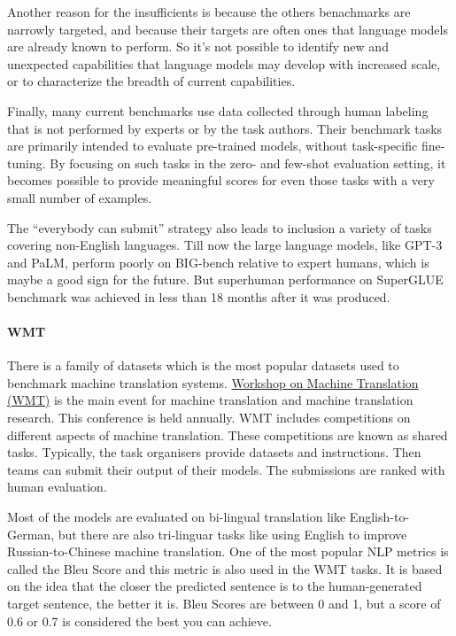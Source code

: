 \documentclass[
]{krantz}
\begin{document}
Another reason for the insufficients is because the others benachmarks are narrowly targeted, and because their targets are often ones that language models are already known to perform. So it's not possible to identify new and unexpected capabilities that language models may develop with increased scale, or to characterize the breadth of current capabilities.

Finally, many current benchmarks use data collected through human labeling that is not performed by experts or by the task authors. Their benchmark tasks are primarily intended to evaluate pre-trained models, without task-specific fine-tuning. By focusing on such tasks in the zero- and few-shot evaluation setting, it becomes possible to provide meaningful scores for even those tasks with a very small number of examples.

The ``everybody can submit'' strategy also leads to inclusion a variety of tasks covering non-English languages. Till now the large language models, like GPT-3 and PaLM, perform poorly on BIG-bench relative to expert humans, which is maybe a good sign for the future. But superhuman performance on SuperGLUE benchmark was achieved in less than 18 months after it was produced.

\hypertarget{wmt}{%
\paragraph{WMT}\label{wmt}}

There is a family of datasets which is the most popular datasets used to benchmark machine translation systems. \href{https://machinetranslate.org/wmt}{Workshop on Machine Translation (WMT)} is the main event for machine translation and machine translation research. This conference is held annually. WMT includes competitions on different aspects of machine translation. These competitions are known as shared tasks. Typically, the task organisers provide datasets and instructions. Then teams can submit their output of their models. The submissions are ranked with human evaluation.

Most of the models are evaluated on bi-lingual translation like English-to-German, but there are also tri-linguar tasks like using English to improve Russian-to-Chinese machine translation. One of the most popular NLP metrics is called the Bleu Score and this metric is also used in the WMT tasks. It is based on the idea that the closer the predicted sentence is to the human-generated target sentence, the better it is. Bleu Scores are between 0 and 1, but a score of 0.6 or 0.7 is considered the best you can achieve.
\end{document}
